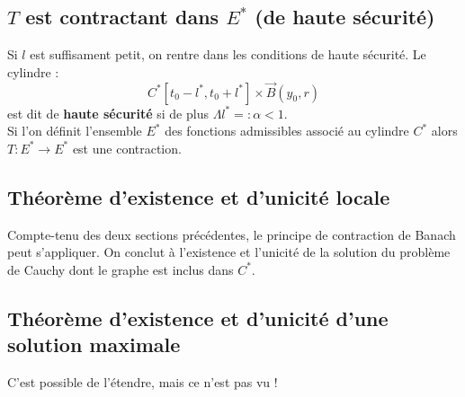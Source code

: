 	\subsection{$T$ est contractant dans $E^*$ (de haute sécurité)}
	Si $l$ est suffisament petit, on rentre dans les conditions de haute sécurité. Le 
	cylindre :
	\begin{equation}
	C^* [t_0-l^*, t_0+l^*]\times\vec{B}(y_0,r)
	\end{equation}
	est dit de \textbf{haute sécurité} si de plus $\Lambda l^* =: \alpha < 1$.\\
	Si l'on définit l'ensemble $E^*$ des fonctions admissibles associé au cylindre 
	$C^*$ alors $T : E^* \rightarrow E^*$ est une contraction.
	
	\subsection{Théorème d'existence et d'unicité locale}
	Compte-tenu des deux sections précédentes, le principe de contraction de Banach 
	peut s'appliquer. On conclut à l'existence et l'unicité de la solution du problème 
	de Cauchy dont le graphe est inclus dans $C^*$.
	
	
	
	\subsection{Théorème d'existence et d'unicité d'une solution maximale}
	C'est possible de l'étendre, mais ce n'est pas vu !
	
	
	
	
	
	
	
	
	
	
	
	
	
	
	
	
	
	
	
	
	
	
	
	
	
	
	
	
	
	
	
	